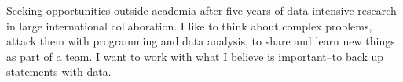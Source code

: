 

\begin{cvparagraph}

Seeking opportunities outside academia after five years of data intensive research in large international collaboration. 
I like to think about complex problems, attack them with programming and data analysis, to share and learn new things as part of a team.
I want to work with what I believe is important–to back up statements with data.


\end{cvparagraph}